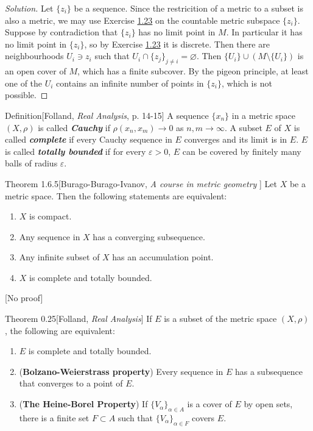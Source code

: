 \begin{proof}[Solution]\leavevmode
Let $\{z_i\}$ be a sequence. Since the restricition of a metric to a subset is also a metric, we may use Exercise \hyperref[exer:1.23]{1.23} on the countable metric subspace $\{z_i\}$. Suppose by contradiction that $\{z_i\}$ has no limit point in $M$. In particular it has no limit point in $\{z_i\}$, so by Exercise \hyperref[exer:1.23]{1.23} it is discrete. Then there are neighbourhoods $U_i \ni z_i$ such that $U_i \cap\{z_j\}_{j \neq  i}=\varnothing$. Then $\{U_i\} \cup  (M\setminus \{U_i\})$ is an open cover of $M$, which has a finite subcover. By the pigeon principle, at least one of the $U_i$ contains an infinite number of points in $\{z_i\}$, which is not possible.
\end{proof}

\begin{thing3}{Definition}[Folland, \textit{Real Analysis}, p. 14-15] \leavevmode
	A sequence $\{x_n\}$ in a metric space $(X,\rho)$ is called \textit{\textbf{Cauchy}} if $\rho(x_n,x_m)\to 0$ as $n,m \to \infty$. A subset $E$ of $X$ is called \textit{\textbf{complete}} if every Cauchy sequence in $E$ converges and its limit is in $E$. $E$ is called \textit{\textbf{totally bounded}} if for every $\varepsilon>0$, $E$ can be covered by finitely many balls of radius $\varepsilon$.
\end{thing3}

\begin{thing1}{Theorem 1.6.5}[Burago-Burago-Ivanov, \textit{A course in metric geometry} ]\leavevmode
	Let $X$ be a metric space. Then the following statements are equivalent:
	\begin{enumerate}
	\item $X$ is compact.
	\item Any sequence in $X$ has a converging subsequence.
	\item Any infinite subset of $X$ has an accumulation point.
	\item $X$ is complete and totally bounded.
	\end{enumerate}
	[No proof]
\end{thing1}

\begin{thing1}{Theorem 0.25}[Folland, \textit{Real Analysis}]\leavevmode
	If $E$ is a subset of the metric space $(X,\rho)$, the following are equivalent:
	\begin{enumerate}[label=(\alph*)]
	\item $E$ is complete and totally bounded.
	\item (\textbf{Bolzano-Weierstrass property}) Every sequence in $E$ has a subsequence that converges to a point of $E$.
	\item (\textbf{The Heine-Borel Property}) If $\{V_\alpha\}_{\alpha \in A}$ is a cover of $E$ by open sets, there is a finite set $F \subset A $ such that $\{ V_\alpha\}_{\alpha \in F}$ covers $E$.
	\end{enumerate}
\end{thing1}

